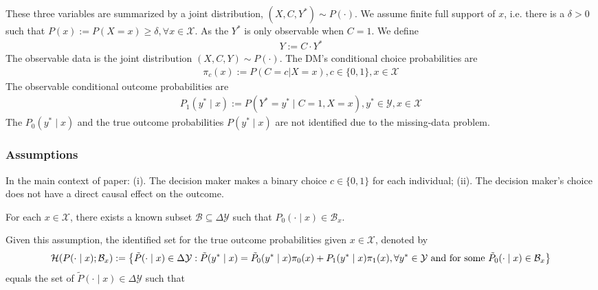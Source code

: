 \documentclass[11pt]{elegantbook}
\begin{document}
These three variables are summarized by a joint distribution, $(X,C,Y^*)\sim P(\cdot)$. We assume finite full support of $x$, i.e. there is a $\delta>0$ such that $P(x):=P(X=x)\geq \delta,\forall x\in \mathcal{X}$. As the $Y^*$ is only observable when $C=1$. We define
\begin{equation}
    \begin{aligned}
        Y:=C\cdot Y^*
    \end{aligned}
    \nonumber
\end{equation}
The observable data is the joint distribution $(X,C,Y)\sim P(\cdot)$. The DM's conditional choice probabilities are
\begin{equation}
    \begin{aligned}
        \pi_c(x):=P(C=c|X=x),c\in\{0,1\},x\in \mathcal{X}
    \end{aligned}
    \nonumber
\end{equation}
The observable conditional outcome probabilities are
\begin{equation}
    \begin{aligned}
        P_1(y^*\mid x):=P(Y^*=y^*\mid C=1, X=x),y^*\in \mathcal{Y},x\in \mathcal{X}
    \end{aligned}
    \nonumber
\end{equation}
The $P_0(y^*\mid x)$ and the true outcome probabilities $P(y^*\mid x)$ are not identified due to the missing-data problem.

\subsubsection*{Assumptions}
\begin{note}
    In the main context of paper: (i). The decision maker makes a binary choice $c\in\{0,1\}$ for each individual; (ii). The decision maker's choice does not have a direct causal effect on the outcome.
\end{note}

\begin{assumption}
    For each $x\in \mathcal{X}$, there exists a known subset $\mathcal{B}\subseteq \Delta \mathcal{Y}$ such that $P_0(\cdot\mid x)\in \mathcal{B}_x$.
\end{assumption}
Given this assumption, the identified set for the true outcome probabilities given $x\in \mathcal{X}$, denoted by
\begin{equation}
    \begin{aligned}
        \mathcal{H}(P(\cdot\mid x);\mathcal{B}_x):=\left\{\tilde{P}(\cdot\mid x)\in\Delta \mathcal{Y}: \tilde{P}(y^*\mid x)=\tilde{P}_0(y^*\mid x)\pi_0(x)+P_1(y^*\mid x)\pi_1(x),\forall y^*\in \mathcal{Y} \textnormal{ and for some } \tilde{P}_0(\cdot\mid x)\in \mathcal{B}_x\right\}
    \end{aligned}
    \nonumber
\end{equation}
equals the set of $\tilde{P}(\cdot\mid x)\in\Delta \mathcal{Y}$ such that 





\appendix











\end{document}
